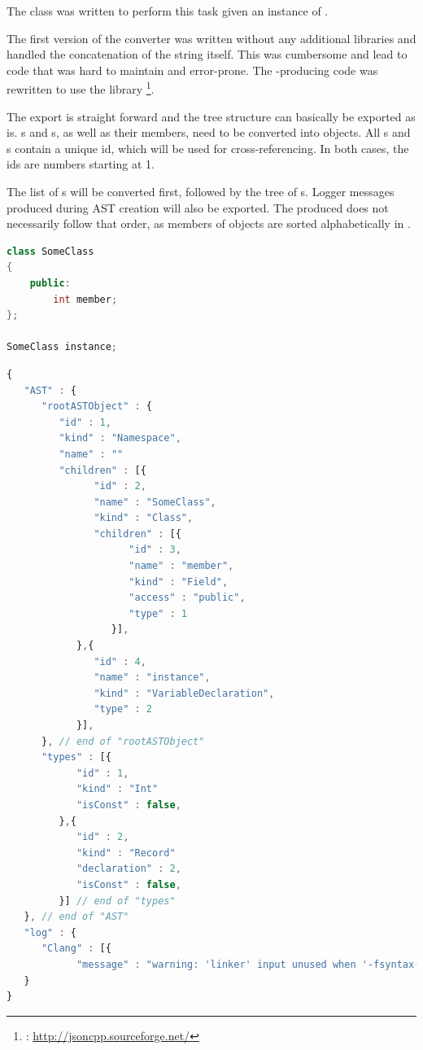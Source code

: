The class  was written to perform this task given an instance of \linebreak{}.

The first version of the converter was written without any additional libraries and handled the concatenation of the  string itself. This was cumbersome and lead to code that was hard to maintain and error-prone. The -producing code was rewritten to use the library \footnote{: \url{http://jsoncpp.sourceforge.net/}}.

The export is straight forward and the tree structure can basically be exported as is. s and s, as well as their members, need to be converted into  objects. All s and s contain a unique id, which will be used for cross-referencing. In both cases, the ids are numbers starting at 1.

The list of s will be converted first, followed by the tree of s. Logger messages produced during AST creation will also be exported. The produced  does not necessarily follow that order, as members of  objects are sorted alphabetically in .

\SingleSpacing
\begin{lstlisting}[language=C++, caption=Example AST for \myProperName{JSON} conversion]
class SomeClass
{
	public:
		int member;
};

SomeClass instance;
\end{lstlisting}
\OnehalfSpacing

\SingleSpacing
\begin{lstlisting}[language=JavaScript, caption=AST converted to \myProperName{JSON} (reduced example), label=listing:JSON]
{
   "AST" : {
      "rootASTObject" : {
         "id" : 1,
         "kind" : "Namespace",
         "name" : ""
         "children" : [{
               "id" : 2,
               "name" : "SomeClass",
               "kind" : "Class",
               "children" : [{
                     "id" : 3,
                     "name" : "member",
                     "kind" : "Field",
                     "access" : "public",
                     "type" : 1
                  }],
            },{
               "id" : 4,
               "name" : "instance",
               "kind" : "VariableDeclaration",
               "type" : 2
            }],
      }, // end of "rootASTObject"
      "types" : [{
            "id" : 1,
            "kind" : "Int"
            "isConst" : false,
         },{
            "id" : 2,
            "kind" : "Record"		 
            "declaration" : 2,
            "isConst" : false,
         }] // end of "types"
   }, // end of "AST"
   "log" : {
      "Clang" : [{
            "message" : "warning: 'linker' input unused when '-fsyntax-only' is present", "type" : "Warning" }]
   }
}
\end{lstlisting}
\OnehalfSpacing

